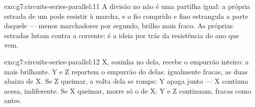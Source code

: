 \begin{solution}{exo:g7:circuits-series-parallel:11}
A divisão no  não é uma partilha igual: a própria estrada de um
 pode resistir à marcha, e o fio comprido e fino estrangula a
parte daquele  --- menos marchadores por segundo, brilho mais
fraco. As próprias estradas lutam contra a corrente: é a ideia por
trás da resistência do ano que vem.
\end{solution}

\begin{solution}{exo:g7:circuits-series-parallel:12}
X, sozinha no  dela, recebe o empurrão inteiro: a mais brilhante.
Y e Z repartem  o empurrão do  delas: igualmente fracas,
as duas abaixo de X. Se Z queimar, a volta dela se rompe: Y apaga
junto --- X continua acesa, indiferente. Se X queimar, morre só o
 de X: Y e Z continuam, fracas como antes.
\end{solution}

